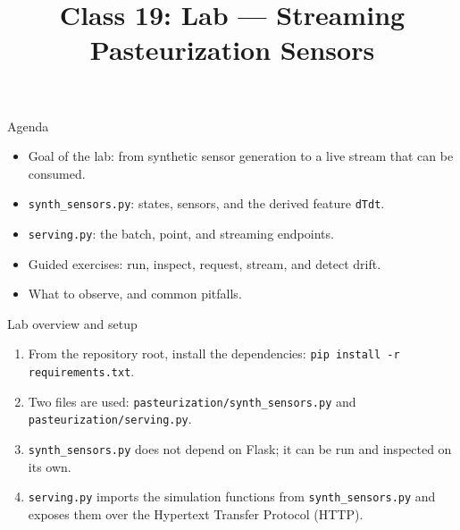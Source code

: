 
\usepackage{amssymb}

\title{Class 19: Lab --- Streaming Pasteurization Sensors}
\author{\coursename}
\date{}



\frame{\titlepage \coursefooter}

\begin{frame}{Agenda}
\begin{itemize}
\item Goal of the lab: from synthetic sensor generation to a live stream that can be consumed.
\item \texttt{synth\_sensors.py}: states, sensors, and the derived feature \texttt{dTdt}.
\item \texttt{serving.py}: the batch, point, and streaming endpoints.
\item Guided exercises: run, inspect, request, stream, and detect drift.
\item What to observe, and common pitfalls.
\end{itemize}
\coursefooter
\end{frame}

\begin{frame}{Lab overview and setup}
\begin{enumerate}
\item From the repository root, install the dependencies: \texttt{pip install -r requirements.txt}.
\item Two files are used: \texttt{pasteurization/synth\_sensors.py} and \texttt{pasteurization/serving.py}.
\item \texttt{synth\_sensors.py} does not depend on Flask; it can be run and inspected on its own.
\item \texttt{serving.py} imports the simulation functions from \texttt{synth\_sensors.py} and exposes them over the Hypertext Transfer Protocol (HTTP).
\end{enumerate}
\coursefooter
\end{frame}

